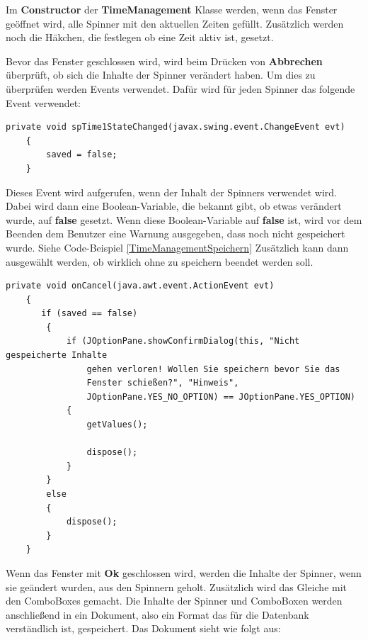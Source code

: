 Im \textbf{Constructor} der \textbf{TimeManagement} Klasse werden, wenn das Fenster geöffnet wird, alle Spinner mit den aktuellen Zeiten gefüllt. Zusätzlich werden noch die Häkchen, die festlegen ob eine Zeit aktiv ist, gesetzt.

\vspace{10pt}

Bevor das Fenster geschlossen wird, wird beim Drücken von \textbf{Abbrechen} überprüft, ob sich die Inhalte der Spinner verändert haben. Um dies zu überprüfen werden Events verwendet. Dafür wird für jeden Spinner das folgende Event verwendet:

\newpage

\begin{lstlisting}[style=JavaStyle, caption=Spinner Event]
    private void spTime1StateChanged(javax.swing.event.ChangeEvent evt)                                     
    {                                         
        saved = false;
    }   
\end{lstlisting} 
Dieses Event wird aufgerufen, wenn der Inhalt der Spinners verwendet wird. Dabei wird dann eine Boolean-Variable, die bekannt gibt, ob etwas verändert wurde, auf \textbf{false} gesetzt. Wenn diese Boolean-Variable auf \textbf{false} ist, wird vor dem Beenden dem Benutzer eine Warnung ausgegeben, dass noch nicht gespeichert wurde. Siehe Code-Beispiel \ref{TimeManagementSpeichern} Zusätzlich kann dann ausgewählt werden, ob wirklich ohne zu speichern beendet werden soll.

\begin{lstlisting}[style=Javastyle, caption=TimeManagement Fenster schließen, label=TimeManagementSpeichern]
 private void onCancel(java.awt.event.ActionEvent evt)                          
    {                              
       if (saved == false)
        {
            if (JOptionPane.showConfirmDialog(this, "Nicht gespeicherte Inhalte 
            	gehen verloren! Wollen Sie speichern bevor Sie das 
            	Fenster schießen?", "Hinweis", 
            	JOptionPane.YES_NO_OPTION) == JOptionPane.YES_OPTION)
            {
                getValues();
                
                dispose();
            }
        }
        else
        {
            dispose();
        }
    }
\end{lstlisting}

\vspace{10pt}

Wenn das Fenster mit \textbf{Ok} geschlossen wird, werden die Inhalte der Spinner, wenn sie geändert wurden, aus den Spinnern geholt. Zusätzlich wird das Gleiche mit den ComboBoxes gemacht. Die Inhalte der Spinner und ComboBoxen werden anschließend in ein Dokument, also ein Format das für die Datenbank verständlich ist, gespeichert. Das Dokument sieht wie folgt aus:

